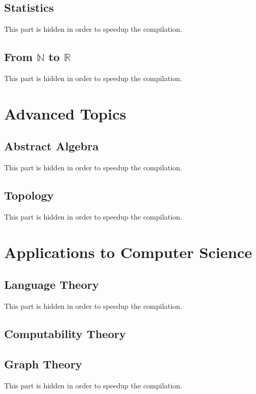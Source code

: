 \documentclass{report}
\theoremstyle{break}
\begin{document}
		\chapter{Statistics}
		    This part is hidden in order to speedup the compilation.
			
		\chapter{From $\mathbb{N}$ to $\mathbb{R}$}
		    This part is hidden in order to speedup the compilation.
	
	\part{Advanced Topics}
	    
	    \chapter{Abstract Algebra}
	        This part is hidden in order to speedup the compilation.
	    
	    \chapter{Topology}
	        This part is hidden in order to speedup the compilation.

	\part{Applications to Computer Science}
	
		\chapter{Language Theory}
		    This part is hidden in order to speedup the compilation.
		
		\chapter{Computability Theory}
			
		
		\chapter{Graph Theory}
		    This part is hidden in order to speedup the compilation.
		
\end{document}
